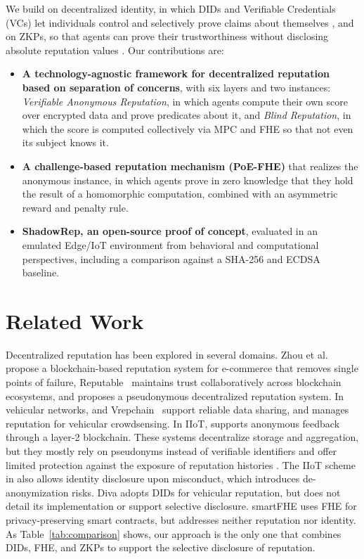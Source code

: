 \documentclass[conference]{IEEEtran}
\begin{document}
We build on decentralized identity, in which DIDs and Verifiable Credentials (VCs) let individuals control and selectively prove claims about themselves \cite{w3c-did, allen2018, 10664246, tan2023survey}, and on ZKPs, so that agents can prove their trustworthiness without disclosing absolute reputation values \cite{surveyprivacypreserving}. Our contributions are:
\begin{itemize}
\item \textbf{A technology-agnostic framework for decentralized reputation based on separation of concerns}, with six layers and two instances: \textit{Verifiable Anonymous Reputation}, in which agents compute their own score over encrypted data and prove predicates about it, and \textit{Blind Reputation}, in which the score is computed collectively via MPC and FHE so that not even its subject knows it.
\item \textbf{A challenge-based reputation mechanism (PoE-FHE)} that realizes the anonymous instance, in which agents prove in zero knowledge that they hold the result of a homomorphic computation, combined with an asymmetric reward and penalty rule.
\item \textbf{ShadowRep, an open-source proof of concept}, evaluated in an emulated Edge/IoT environment from behavioral and computational perspectives, including a comparison against a SHA-256 and ECDSA baseline.
\end{itemize}

\section{Related Work}\label{sec:trabs}
Decentralized reputation has been explored in several domains. Zhou et al.~\cite{ZHOU2021155} propose a blockchain-based reputation system for e-commerce that removes single points of failure, Reputable~\cite{arshad2022reputable} maintains trust collaboratively across blockchain ecosystems, and \cite{10335003} proposes a pseudonymous decentralized reputation system. In vehicular networks, \cite{fernandes2023blockchain} and Vrepchain~\cite{liu2022vrepchain} support reliable data sharing, and \cite{lu2023towards} manages reputation for vehicular crowdsensing. In IIoT, \cite{8640264} supports anonymous feedback through a layer-2 blockchain. These systems decentralize storage and aggregation, but they mostly rely on pseudonyms instead of verifiable identifiers and offer limited protection against the exposure of reputation histories \cite{surveyprivacypreserving}. The IIoT scheme in \cite{8640264} also allows identity disclosure upon misconduct, which introduces de-anonymization risks. Diva \cite{feraudo2024diva} adopts DIDs for vehicular reputation, but does not detail its implementation or support selective disclosure. smartFHE \cite{solomon2023smartfhe} uses FHE for privacy-preserving smart contracts, but addresses neither reputation nor identity. As Table~\ref{tab:comparison} shows, our approach is the only one that combines DIDs, FHE, and ZKPs to support the selective disclosure of reputation.
\end{document}
